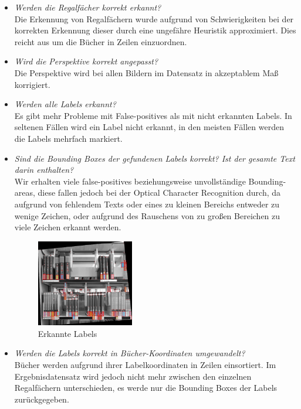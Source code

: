 \documentclass[paper=A4, deutsch]{scrartcl}
\begin{document}
\begin{itemize}
	\item \textit{Werden die Regalfächer korrekt erkannt?}\\
		  Die Erkennung von Regalfächern wurde aufgrund von Schwierigkeiten bei der korrekten Erkennung dieser durch eine ungefähre Heuristik approximiert. Dies reicht aus um die Bücher in Zeilen einzuordnen.
		  
	\item \textit{Wird die Perspektive korrekt angepasst?}\\
		  Die Perspektive wird bei allen Bildern im Datensatz in akzeptablem Maß korrigiert.
		  
	\item \textit{Werden alle Labels erkannt?}\\
		  Es gibt mehr Probleme mit False-positives als mit nicht erkannten Labels. In seltenen Fällen wird ein Label nicht  erkannt, in den meisten Fällen werden die Labels mehrfach markiert.
		  
	\item \textit{Sind die Bounding Boxes der gefundenen Labels korrekt? Ist der gesamte Text darin enthalten?}\\
		  Wir erhalten viele false-positives beziehungsweise unvollständige Bounding-areas, diese fallen jedoch bei der Optical Character Recognition durch, da aufgrund von fehlendem Texts oder eines zu kleinen Bereichs entweder zu wenige Zeichen, oder aufgrund des Rauschens von zu großen Bereichen zu viele Zeichen erkannt werden.
		  
\begin{figure}[H]
 \centering
 \includegraphics[width=0.4\textwidth]{label_det.jpg}
 \caption{Erkannte Labels}
 \label{fig:img}
\end{figure}
		  
	\item \textit{Werden die Labels korrekt in Bücher-Koordinaten umgewandelt?}\\
		  Bücher werden aufgrund ihrer Labelkoordinaten in Zeilen einsortiert. Im Ergebnisdatensatz wird jedoch nicht mehr zwischen den einzelnen Regalfächern unterschieden, es werde nur die Bounding Boxes der Labels zurückgegeben.
		  

\end{itemize}
\end{document}
